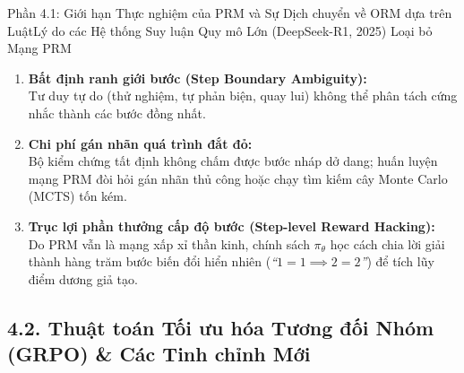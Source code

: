 \begin{frame}{Phần 4.1: Giới hạn Thực nghiệm của PRM và Sự Dịch chuyển về ORM dựa trên Luật}{Lý do các Hệ thống Suy luận Quy mô Lớn (DeepSeek-R1, 2025) Loại bỏ Mạng PRM}
  \small
  \begin{enumerate}\setlength{\itemsep}{7pt}
    \item \textbf{Bất định ranh giới bước (Step Boundary Ambiguity):}\\
      \footnotesize Tư duy tự do (thử nghiệm, tự phản biện, quay lui) không thể phân tách cứng nhắc thành các bước đồng nhất.
    \item \textbf{Chi phí gán nhãn quá trình đắt đỏ:}\\
      \footnotesize Bộ kiểm chứng tất định không chấm được bước nháp dở dang; huấn luyện mạng PRM đòi hỏi gán nhãn thủ công hoặc chạy tìm kiếm cây Monte Carlo (MCTS) tốn kém.
    \item \textbf{Trục lợi phần thưởng cấp độ bước (Step-level Reward Hacking):}\\
      \footnotesize Do PRM vẫn là mạng xấp xỉ thần kinh, chính sách $\pi_\theta$ học cách chia lời giải thành hàng trăm bước biến đổi hiển nhiên (\textit{``$1=1 \implies 2=2$''}) để tích lũy điểm dương giả tạo.
  \end{enumerate}
\end{frame}

\subsection{4.2. Thuật toán Tối ưu hóa Tương đối Nhóm (GRPO) \& Các Tinh chỉnh Mới}

